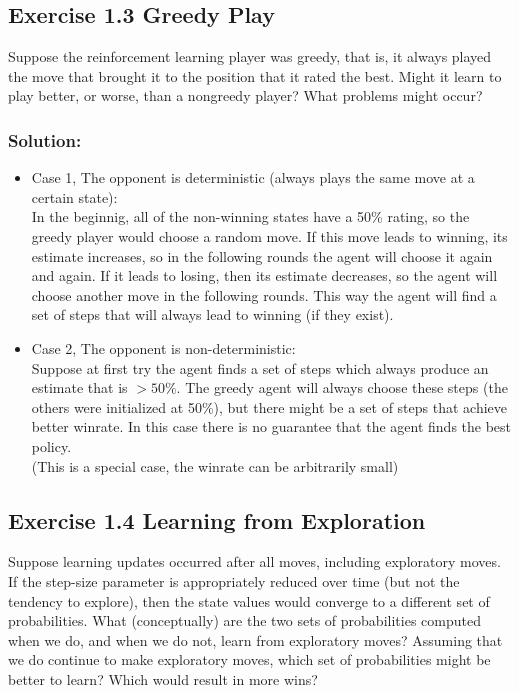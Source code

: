 \subsection*{Exercise 1.3 Greedy Play}
Suppose the reinforcement learning player was greedy, that is,
it always played the move that brought it to the position that it rated the best. Might it learn to play better, or worse, than a nongreedy player? What problems might occur? 

\subsubsection*{Solution:}
\begin{itemize}
    \item Case 1, The opponent is deterministic (always plays the same move at a certain state):\\
    In the beginnig, all of the non-winning states have a 50\% rating, so the greedy player would choose a random move. If this move leads to winning, its estimate increases, so in the following rounds the agent will choose it again and again. If it leads to losing, then its estimate decreases, so the agent will choose another move in the following rounds. This way the agent will find a set of steps that will always lead to winning (if they exist).
    \item Case 2, The opponent is non-deterministic:\\
    Suppose at first try the agent finds a set of steps which always produce an estimate that is $>50\%$. The greedy agent will always choose these steps (the others were initialized at 50\%), but there might be a set of steps that achieve better winrate. In this case there is no guarantee that the agent finds the best policy.\\
    (This is a special case, the winrate can be arbitrarily small)  
  \end{itemize}

\subsection*{Exercise 1.4 Learning from Exploration}
Suppose learning updates occurred after all
moves, including exploratory moves. If the step-size parameter is appropriately reduced
over time (but not the tendency to explore), then the state values would converge to
a different set of probabilities. What (conceptually) are the two sets of probabilities
computed when we do, and when we do not, learn from exploratory moves? Assuming
that we do continue to make exploratory moves, which set of probabilities might be better
to learn? Which would result in more wins?

